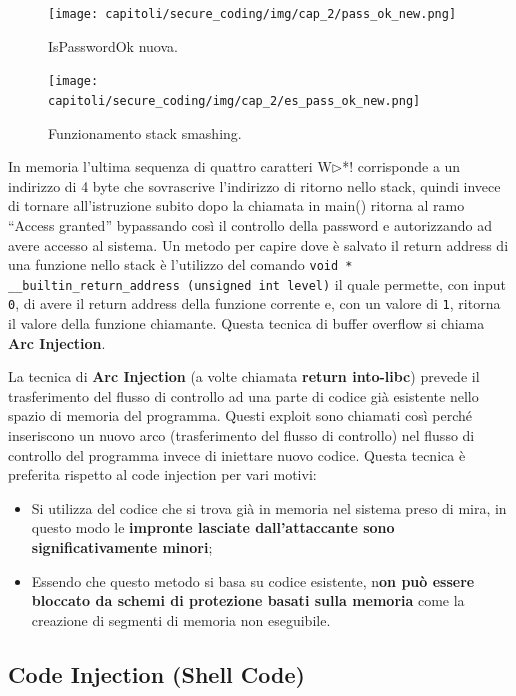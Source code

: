 \begin{figure}[H]
    \centering
    \texttt{[image: capitoli/secure\_coding/img/cap\_2/pass\_ok\_new.png]}
    \caption{IsPasswordOk nuova.}\label{fig:pass_ok_new}
\end{figure}

\begin{figure}[H]
    \centering
    \texttt{[image: capitoli/secure\_coding/img/cap\_2/es\_pass\_ok\_new.png]}
    \caption{Funzionamento stack smashing.}\label{fig:es_pass_ok_new}
\end{figure}

In memoria l'ultima sequenza di quattro caratteri W$\triangleright$*! corrisponde a
un indirizzo di 4 byte che sovrascrive l'indirizzo di ritorno nello stack, quindi
invece di tornare all'istruzione subito dopo la chiamata in main() ritorna al ramo
``Access granted'' bypassando così il controllo della password e autorizzando ad avere
accesso al sistema.
Un metodo per capire dove è salvato il return address di una funzione nello stack è
l'utilizzo del comando
\verb|void * __builtin_return_address (unsigned int level)| il quale permette, con
input \verb|0|, di avere il return address della funzione corrente e, con un valore di
\verb|1|, ritorna il valore della funzione chiamante. Questa tecnica di buffer overflow si
chiama \textbf{Arc Injection}.


La tecnica di \textbf{Arc Injection} (a volte chiamata \textbf{return into-libc}) prevede
il trasferimento del flusso di controllo ad una parte di codice già esistente nello spazio di memoria del programma.
Questi exploit sono chiamati così perché inseriscono un nuovo arco
(trasferimento del flusso di controllo) nel flusso di controllo del programma invece
di iniettare nuovo codice. Questa tecnica è preferita rispetto al code injection
per vari motivi:

\begin{itemize}
    \item Si utilizza del codice che si trova già in memoria nel sistema preso di mira,
          in questo modo le \textbf{impronte lasciate dall'attaccante sono significativamente minori};
    \item Essendo che questo metodo si basa su codice
          esistente, n\textbf{on può essere bloccato da schemi di protezione basati sulla memoria}
          come la creazione di segmenti di memoria non eseguibile.
\end{itemize}

\subsection{Code Injection (Shell Code)}

